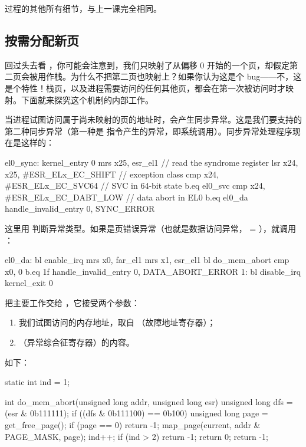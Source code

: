  过程的其他所有细节，与上一课完全相同。

\subsection{按需分配新页}

回过头去看 ，你可能会注意到，我们只映射了从偏移 0 开始的一个页，却假定第二页会被用作栈。为什么不把第二页也映射上？如果你认为这是个 bug——不，这是个特性！栈页，以及进程需要访问的任何其他页，都会在第一次被访问时才映射。下面就来探究这个机制的内部工作。

当进程试图访问属于尚未映射的页的地址时，会产生同步异常。这是我们要支持的第二种同步异常（第一种是  指令产生的异常，即系统调用）。同步异常处理程序现在是这样的：

\begin{asmcode}
el0_sync:
	kernel_entry 0
	mrs	x25, esr_el1				// read the syndrome register
	lsr	x24, x25, #ESR_ELx_EC_SHIFT		// exception class
	cmp	x24, #ESR_ELx_EC_SVC64			// SVC in 64-bit state
	b.eq	el0_svc
	cmp	x24, #ESR_ELx_EC_DABT_LOW		// data abort in EL0
	b.eq	el0_da
	handle_invalid_entry 0, SYNC_ERROR
\end{asmcode}

这里用  判断异常类型。如果是页错误异常（也就是数据访问异常， = ），就调用 ：

\begin{asmcode}
el0_da:
	bl	enable_irq
	mrs	x0, far_el1
	mrs	x1, esr_el1
	bl	do_mem_abort
	cmp x0, 0
	b.eq 1f
	handle_invalid_entry 0, DATA_ABORT_ERROR
1:
	bl disable_irq
	kernel_exit 0
\end{asmcode}

 把主要工作交给 ，它接受两个参数：

\begin{enumerate}
  \item 我们试图访问的内存地址，取自 （故障地址寄存器）；
  \item {}（异常综合征寄存器）的内容。
\end{enumerate}

 如下：

\begin{ccode}
static int ind = 1;

int do_mem_abort(unsigned long addr, unsigned long esr) {
	unsigned long dfs = (esr & 0b111111);
	if ((dfs & 0b111100) == 0b100) {
		unsigned long page = get_free_page();
		if (page == 0) {
			return -1;
		}
		map_page(current, addr & PAGE_MASK, page);
		ind++;
		if (ind > 2){
			return -1;
		}
		return 0;
	}
	return -1;
}
\end{ccode}


